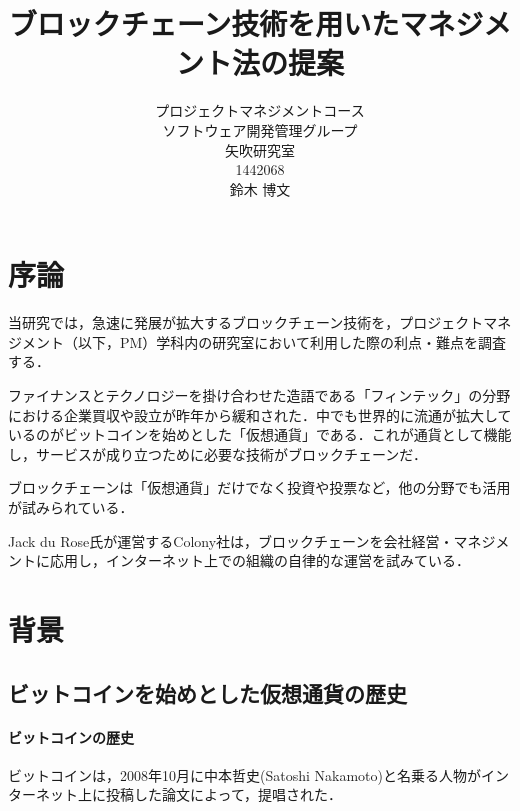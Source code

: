 \title{ブロックチェーン技術を用いたマネジメント法の提案}
\author{プロジェクトマネジメントコース\\
ソフトウェア開発管理グループ\\
矢吹研究室\\
1442068\\
鈴木 博文}
\date{}

\maketitle



\tableofcontents%

\chapter{序論}
当研究では，急速に発展が拡大するブロックチェーン技術を，プロジェクトマネジメント（以下，PM）学科内の研究室において利用した際の利点・難点を調査する．

ファイナンスとテクノロジーを掛け合わせた造語である「フィンテック」の分野における企業買収や設立が昨年から緩和された\cite{touyou}．中でも世界的に流通が拡大しているのがビットコインを始めとした「仮想通貨」である．これが通貨として機能し，サービスが成り立つために必要な技術がブロックチェーンだ．

ブロックチェーンは「仮想通貨」だけでなく投資や投票など，他の分野でも活用が試みられている．

Jack du Rose氏が運営するColony社は，ブロックチェーンを会社経営・マネジメントに応用し，インターネット上での組織の自律的な運営を試みている\cite{wired}．

\chapter{背景}

\section{ビットコインを始めとした仮想通貨の歴史}
\subsubsection{ビットコインの歴史}
ビットコインは，2008年10月に中本哲史(Satoshi Nakamoto)と名乗る人物がインターネット上に投稿した論文によって，提唱された．

